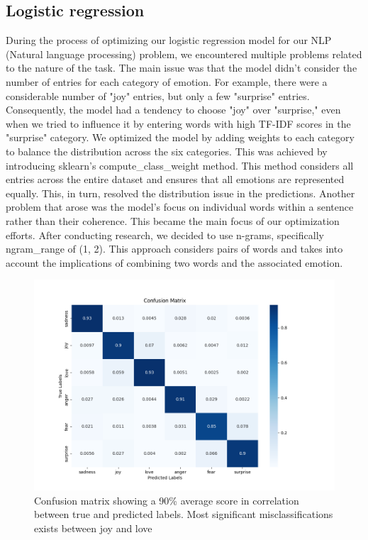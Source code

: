 \subsection{Logistic regression}
During the process of optimizing our logistic regression model for our NLP (Natural language processing) problem, we encountered multiple problems related to the nature of the task. The main issue was that the model didn’t consider the number of entries for each category of emotion. For example, there were a considerable number of "joy" entries, but only a few "surprise" entries. Consequently, the model had a tendency to choose "joy" over "surprise," even when we tried to influence it by entering words with high TF-IDF scores in the "surprise" category.
We optimized the model by adding weights to each category to balance the distribution across the six categories. This was achieved by introducing sklearn’s compute\_class\_weight method. This method considers all entries across the entire dataset and ensures that all emotions are represented equally. This, in turn, resolved the distribution issue in the predictions.
Another problem that arose was the model’s focus on individual words within a sentence rather than their coherence. This became the main focus of our optimization efforts. After conducting research, we decided to use n-grams, specifically ngram\_range of (1, 2). This approach considers pairs of words and takes into account the implications of combining two words and the associated emotion. \autocite{logistic-regression}

\begin{figure}[H]
    \centering
    \includegraphics[width=1\columnwidth]{images/Confusion_matrix.png}
    \caption{Confusion matrix showing a 90\% average score in correlation between true and predicted labels. Most significant misclassifications exists between joy and love}
    \label{fig:correlation_plot}
\end{figure}

